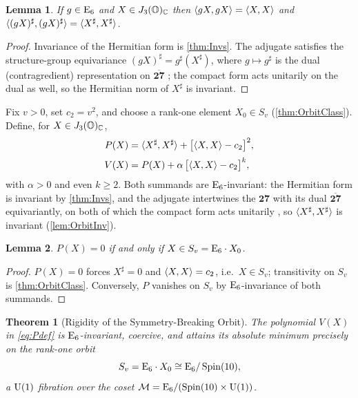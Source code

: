 \documentclass[pdflatex,sn-mathphys-num]{sn-jnl}
\theoremstyle{thmstyleone}
\newtheorem{theorem}{Theorem}
\newtheorem{lemma}[lemma]{Lemma}
\theoremstyle{thmstylethree}%
\theoremstyle{thmstyletwo}%
\begin{document}
\begin{lemma}\label{lem:OrbitInv}
If $g\in \mathrm{E}_{6}$ and $X\in J_3(\mathbb{O})_{\mathbb C}$ then
$\langle gX,gX\rangle=\langle X,X\rangle$ and $\langle (gX)^{\sharp},(gX)^{\sharp}\rangle
=\langle X^{\sharp},X^{\sharp}\rangle$.
\end{lemma}

\begin{proof}
Invariance of the Hermitian form is \autoref{thm:Invs}. The adjugate satisfies
the structure-group equivariance $(gX)^{\sharp}=g^{\sharp}(X^{\sharp})$, where
$g\mapsto g^{\sharp}$ is the dual (contragredient) representation on
$\overline{\mathbf{27}}$ \cite{Springer:2000,McCrimmon:2004}; the compact form
acts unitarily on the dual as well, so the Hermitian norm of $X^{\sharp}$ is
invariant.
\end{proof}

Fix $v>0$, set $c_{2}=v^{2}$, and choose a rank-one element
$X_{0}\in S_{v}$ (\autoref{thm:OrbitClass}). Define, for $X\in J_3(\mathbb{O})_{\mathbb C}$,
\begin{equation}\label{eq:Pdef}
\begin{aligned}
  P(X)
  &=\langle X^{\sharp},X^{\sharp}\rangle
  +\bigl[\langle X,X\rangle-c_{2}\bigr]^{2},\\[2pt]
  V(X)
  &=P(X)
  +\alpha\,\bigl[\langle X,X\rangle-c_{2}\bigr]^{k},
\end{aligned}
\end{equation}
with $\alpha>0$ and even $k\ge2$. Both summands are $\mathrm{E}_{6}$-invariant: the
Hermitian form is invariant by \autoref{thm:Invs}, and the adjugate
intertwines the $\mathbf{27}$ with its dual $\overline{\mathbf{27}}$
equivariantly, on both of which the compact form acts unitarily
\cite{Springer:2000}, so $\langle X^{\sharp},X^{\sharp}\rangle$ is invariant
(\autoref{lem:OrbitInv}).

\begin{lemma}\label{lem:Zeros}
$P(X)=0$ if and only if $X\in S_{v}=\mathrm{E}_{6}\cdot X_{0}$.
\end{lemma}

\begin{proof}
$P(X)=0$ forces $X^{\sharp}=0$ and $\langle X,X\rangle=c_{2}$, i.e.\
$X\in S_{v}$; transitivity on $S_{v}$ is \autoref{thm:OrbitClass}.
Conversely, $P$ vanishes on $S_{v}$ by $\mathrm{E}_{6}$-invariance of both summands.
\end{proof}
\begin{theorem}[Rigidity of the Symmetry-Breaking Orbit]
\label{thm:Breaking}
The polynomial $V(X)$ in \eqref{eq:Pdef} is $\mathrm{E}_{6}$-invariant, coercive, and
attains its absolute minimum precisely on the rank-one orbit
\[
  S_{v}=\mathrm{E}_{6}\cdot X_{0}
  \cong
  \mathrm{E}_{6}/\operatorname{Spin}(10),
\]
a $\mathrm{U(1)}$ fibration over the coset $\mathcal{M}=\mathrm{E}_{6}/(\operatorname{Spin}(10) \times \mathrm{U(1)})$.
\end{theorem}
\end{document}
